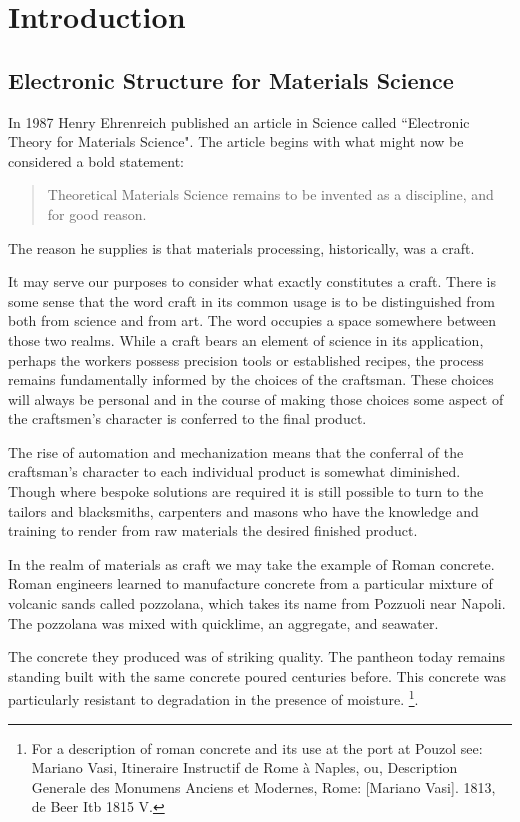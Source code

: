\chapter{Introduction}
\section{Electronic Structure for Materials Science}
In 1987 Henry Ehrenreich published an article in Science called
``Electronic Theory for Materials Science". The article begins
with what might now be considered a bold statement:

\begin{quote}
Theoretical Materials Science remains to be invented as a discipline, and for good reason.
\end{quote}

The reason he supplies is that materials processing, historically, was a craft. 

It may serve our purposes to consider what exactly constitutes a craft. 
%
There is some sense that the word craft in its common usage 
is to be distinguished from both from science and from art.
%
The word occupies a space somewhere between those two realms. 
%
While a craft bears an element of science
in its application, perhaps the workers possess precision tools or 
established recipes, the process remains fundamentally informed by 
the choices of the craftsman. These choices will always be personal
and in the course of making those choices some aspect of the craftsmen's 
character is conferred to the final product. 

The rise of automation and mechanization means that the conferral
of the craftsman's character to each individual product is 
somewhat diminished.
Though where bespoke solutions are required it is still possible
to turn to the tailors and blacksmiths, carpenters and masons who
have the knowledge and training to render from raw materials
the desired finished product.

In the realm of materials as craft we may take the example of Roman concrete.
%
Roman engineers learned to manufacture concrete from a 
particular mixture of volcanic sands called pozzolana, which
takes its name from Pozzuoli near Napoli. 
%
The pozzolana was mixed with quicklime, an aggregate, and seawater.

The concrete they produced was of striking quality. 
%
The pantheon today remains standing built with the same concrete poured centuries before.
%
This concrete was particularly resistant to degradation in the presence of moisture.
\footnote{For a description of roman concrete and its use at the port at Pouzol see: Mariano Vasi, 
Itineraire Instructif de Rome à Naples, ou, Description Generale des Monumens Anciens et Modernes, 
Rome: [Mariano Vasi]. 1813, de Beer Itb 1815 V.}. 

